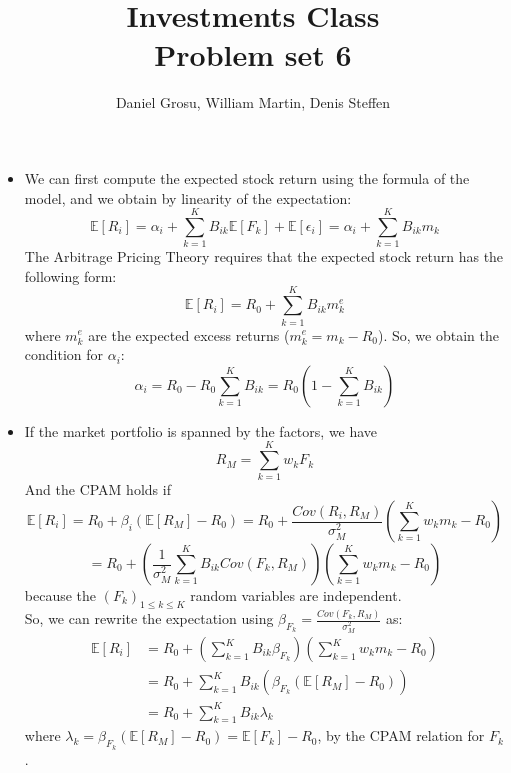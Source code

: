 \documentclass[10pt]{article}
\newcommand{\Ebb}{\mathbb{E}}
\newenvironment{exercise}[2][Exercise]{\begin{trivlist}
  \item[\hskip \labelsep {\bfseries #1}\hskip \labelsep {\bfseries #2.}]}{\end{trivlist}}
\begin{document}
  \pagecolor{solar}
	
  \renewcommand{\qedsymbol}{\smiley}
	\title{Investments Class \\ Problem set 6}
	\author{Daniel Grosu, William Martin, Denis Steffen}
		
\maketitle

\begin{exercise}{1}
  \begin{itemize}
    \item We can first compute the expected stock return using the formula of the model, and we obtain by linearity of the expectation: 
     $$ \Ebb[R_i] = \alpha_i + \sum_{k=1}^K B_{ik}\Ebb[F_k] + \Ebb[\epsilon_i] = \alpha_i + \sum_{k=1}^K B_{ik}m_k $$
     The Arbitrage Pricing Theory requires that the expected stock return has the following form: $$ \Ebb[R_i] = R_0 + \sum_{k=1}^K B_{ik}m_k^e$$ where $m_k^e$ are the expected excess returns ($m_k^e = m_k - R_0$). 
     So, we obtain the condition for $\alpha_i$: 
     $$ \alpha_i = R_0 - R_0\sum_{k=1}^K B_{ik} = R_0(1-\sum_{k=1}^KB_{ik})$$
    \item If the market portfolio is spanned by the factors, we have $$ R_M = \sum_{k=1}^Kw_kF_k$$ And the CPAM holds if $$ \Ebb[R_i] = R_0 + \beta_i(\Ebb[R_M]-R_0) = R_0 + \frac{Cov(R_i,R_M)}{\sigma_M^2}(\sum_{k=1}^Kw_km_k-R_0)$$
    $$ = R_0 + \left(\frac{1}{\sigma_M^2}\sum_{k=1}^KB_{ik}Cov(F_k,R_M)\right)(\sum_{k=1}^Kw_km_k-R_0)$$ because the $(F_k)_{1\leq k\leq K}$ random variables are independent.
    \\
    So, we can rewrite the expectation using $\beta_{F_k} = \frac{Cov(F_k,R_M)}{\sigma_M^2}$ as: 
    \begin{align*}
      \Ebb[R_i] &= R_0 + \left(\sum_{k=1}^K B_{ik}\beta_{F_k}\right)\left(\sum_{k=1}^Kw_km_k-R_0\right) \\
      &= R_0 + \sum_{k=1}^K B_{ik}(\beta_{F_k}(\Ebb[R_M]-R_0)) \\
      &= R_0 + \sum_{k=1}^K B_{ik}\lambda_k
    \end{align*} where $ \lambda_k = \beta_{F_k}(\Ebb[R_M]-R_0) = \Ebb[F_k] - R_0$, by the CPAM relation for $F_k$.


\end{itemize}
\end{exercise}
\end{document}
